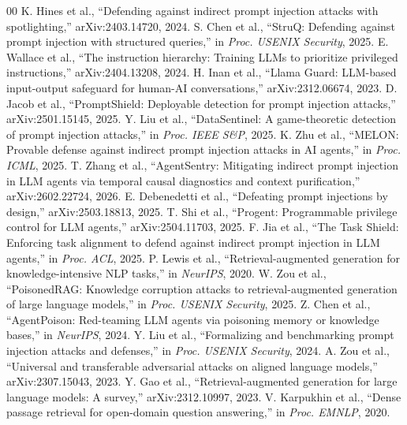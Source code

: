 \documentclass[conference]{IEEEtran}
\begin{document}
\begin{thebibliography}{00}
 K. Hines et al., ``Defending against indirect prompt injection attacks with spotlighting,'' arXiv:2403.14720, 2024.
 S. Chen et al., ``StruQ: Defending against prompt injection with structured queries,'' in \textit{Proc. USENIX Security}, 2025.
 E. Wallace et al., ``The instruction hierarchy: Training LLMs to prioritize privileged instructions,'' arXiv:2404.13208, 2024.
 H. Inan et al., ``Llama Guard: LLM-based input-output safeguard for human-AI conversations,'' arXiv:2312.06674, 2023.
 D. Jacob et al., ``PromptShield: Deployable detection for prompt injection attacks,'' arXiv:2501.15145, 2025.
 Y. Liu et al., ``DataSentinel: A game-theoretic detection of prompt injection attacks,'' in \textit{Proc. IEEE S\&P}, 2025.
 K. Zhu et al., ``MELON: Provable defense against indirect prompt injection attacks in AI agents,'' in \textit{Proc. ICML}, 2025.
 T. Zhang et al., ``AgentSentry: Mitigating indirect prompt injection in LLM agents via temporal causal diagnostics and context purification,'' arXiv:2602.22724, 2026.
 E. Debenedetti et al., ``Defeating prompt injections by design,'' arXiv:2503.18813, 2025.
 T. Shi et al., ``Progent: Programmable privilege control for LLM agents,'' arXiv:2504.11703, 2025.
 F. Jia et al., ``The Task Shield: Enforcing task alignment to defend against indirect prompt injection in LLM agents,'' in \textit{Proc. ACL}, 2025.
 P. Lewis et al., ``Retrieval-augmented generation for knowledge-intensive NLP tasks,'' in \textit{NeurIPS}, 2020.
 W. Zou et al., ``PoisonedRAG: Knowledge corruption attacks to retrieval-augmented generation of large language models,'' in \textit{Proc. USENIX Security}, 2025.
 Z. Chen et al., ``AgentPoison: Red-teaming LLM agents via poisoning memory or knowledge bases,'' in \textit{NeurIPS}, 2024.
 Y. Liu et al., ``Formalizing and benchmarking prompt injection attacks and defenses,'' in \textit{Proc. USENIX Security}, 2024.
 A. Zou et al., ``Universal and transferable adversarial attacks on aligned language models,'' arXiv:2307.15043, 2023.
 Y. Gao et al., ``Retrieval-augmented generation for large language models: A survey,'' arXiv:2312.10997, 2023.
 V. Karpukhin et al., ``Dense passage retrieval for open-domain question answering,'' in \textit{Proc. EMNLP}, 2020.

\end{thebibliography}
\end{document}
